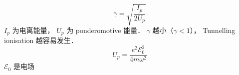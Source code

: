 
\begin{equation}
\gamma = \sqrt{\frac{I_p}{2U_p}}
\end{equation}
$I_p$ 为电离能量， $U_p$ 为 ponderomotive 能量． $\gamma$ 越小（$\gamma < 1$）， Tunnelling ionisation 越容易发生．
\begin{equation}
U_p = \frac{e^2 \mathcal E_0^2}{4m\omega^2}
\end{equation}
$\mathcal E_0$ 是电场
